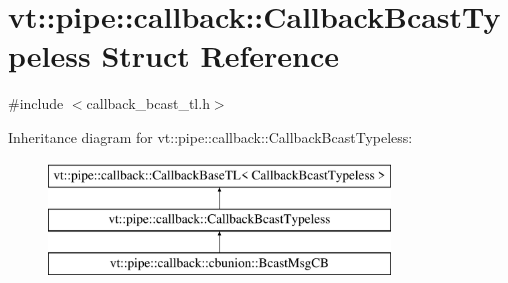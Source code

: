 \hypertarget{structvt_1_1pipe_1_1callback_1_1_callback_bcast_typeless}{}\section{vt\+:\+:pipe\+:\+:callback\+:\+:Callback\+Bcast\+Typeless Struct Reference}
\label{structvt_1_1pipe_1_1callback_1_1_callback_bcast_typeless}


{\ttfamily \#include $<$callback\+\_\+bcast\+\_\+tl.\+h$>$}

Inheritance diagram for vt\+:\+:pipe\+:\+:callback\+:\+:Callback\+Bcast\+Typeless\+:\begin{figure}[H]
\begin{center}
\leavevmode
\includegraphics[height=3.000000cm]{structvt_1_1pipe_1_1callback_1_1_callback_bcast_typeless}
\end{center}
\end{figure}
